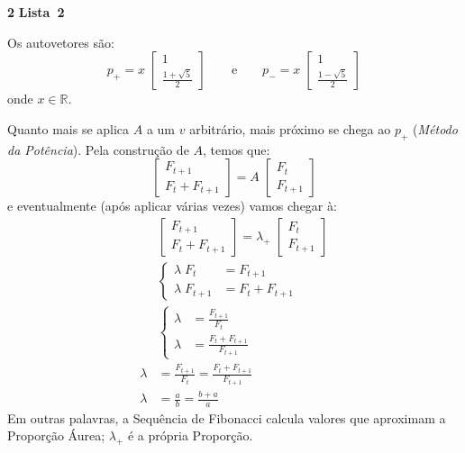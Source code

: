 \documentclass{article}
\newcommand{\R}{\mathbb{R}}
\newcounter{exe-list}
\newenvironment{exe-list}
    {\begin{list}{(\alph{exe-list})}{\usecounter{exe-list}}}
    {\end{list}}
\newenvironment{exe}[2][Sala]
    {\bigskip\noindent\par\ifthenelse{\equal{#1}{}}%
        {\textbf{\LARGE #2}}%
        {\textbf{\LARGE #1~#2}}%
    \medskip\noindent\par}
    {\bigskip}
\begin{document}
\begin{exe}[Lista]{2}
\begin{exe-list}
            Os autovetores são:
            \[
                p_+ = x \; \begin{bmatrix}
                    1 \\ \frac{1 + \sqrt{5}}{2}
                \end{bmatrix}
                \qquad\text{e}\qquad
                p_- = x \; \begin{bmatrix}
                    1 \\ \frac{1 - \sqrt{5}}{2}
                \end{bmatrix}
            \]
            onde \(x \in \R\).

            Quanto mais se aplica \(A\)
            a um \(v\) arbitrário,
            mais próximo se chega ao \(p_+\)
            (\emph{Método da Potência}).
            Pela construção de \(A\),
            temos que:
            \[
                \begin{bmatrix}
                    F_{t+1} \\ F_t + F_{t+1}
                \end{bmatrix} = A \;
                \begin{bmatrix}
                    F_t \\ F_{t+1}
                \end{bmatrix}
            \]
            e eventualmente (após aplicar várias vezes)
            vamos chegar à:
            \begin{align*}
                &\begin{bmatrix}
                        F_{t+1} \\ F_t + F_{t+1}
                    \end{bmatrix} = \lambda_+ \; \begin{bmatrix}
                        F_t \\ F_{t+1}
                    \end{bmatrix} \\
                &\begin{cases}
                        \lambda \; F_t &= F_{t+1} \\
                        \lambda \; F_{t+1} &= F_t + F_{t+1}
                    \end{cases} \\
                &\begin{cases}
                        \lambda &= \frac{F_{t+1}}{F_t} \\
                        \lambda &= \frac{F_t + F_{t+1}}{F_{t+1}}
                    \end{cases} \\
                \lambda &= \frac{F_{t+1}}{F_t} = \frac{F_t + F_{t+1}}{F_{t+1}} \\
                \lambda &= \frac{a}{b} = \frac{b + a}{a}
            \end{align*}
            Em outras palavras,
            a Sequência de Fibonacci calcula valores
            que aproximam a Proporção Áurea;
            \(\lambda_+\) é a própria Proporção.


\end{exe-list}
\end{exe}
\end{document}
